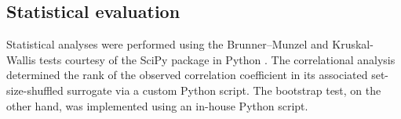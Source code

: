 \subsection{Statistical evaluation}
Statistical analyses were performed using the Brunner--Munzel and Kruskal-Wallis tests courtesy of the SciPy package in Python \cite{virtanen_scipy_2020}. The correlational analysis determined the rank of the observed correlation coefficient in its associated set-size-shuffled surrogate via a custom Python script. The bootstrap test, on the other hand, was implemented using an in-house Python script.

\label{sec:methods}